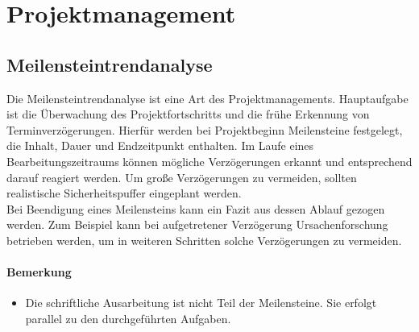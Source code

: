 \section{Projektmanagement}
\subsection{Meilensteintrendanalyse}
Die Meilensteintrendanalyse ist eine Art des Projektmanagements. Hauptaufgabe ist die Überwachung des Projektfortschritts und die frühe Erkennung von Terminverzögerungen. Hierfür werden bei Projektbeginn Meilensteine festgelegt, die Inhalt, Dauer und Endzeitpunkt enthalten. Im Laufe eines Bearbeitungszeitraums können mögliche Verzögerungen erkannt und entsprechend darauf reagiert werden. Um große Verzögerungen zu vermeiden, sollten realistische Sicherheitspuffer eingeplant werden. \\
Bei Beendigung eines Meilensteins kann ein Fazit aus dessen Ablauf gezogen werden. Zum Beispiel kann bei aufgetretener Verzögerung Ursachenforschung betrieben werden, um in weiteren Schritten solche Verzögerungen zu vermeiden. 

\paragraph{Bemerkung}
\begin{itemize}
\item Die schriftliche Ausarbeitung ist nicht Teil der Meilensteine. Sie erfolgt parallel zu den durchgeführten Aufgaben.
\end{itemize}

